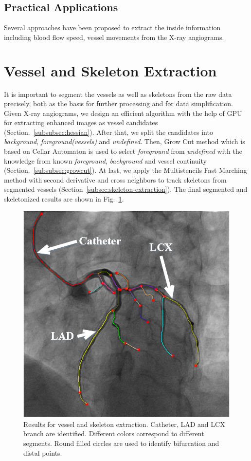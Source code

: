 \documentclass[journal]{IEEEtran}
\begin{document}
\subsection{Practical Applications}
Several approaches have been proposed to extract the inside information including blood flow speed, vessel movements from the X-ray angiograms.

\section{Vessel and Skeleton Extraction}
\label{sec:vessel-skeleton-extraction}
It is important to segment the vessels as well as skeletons from the raw data precisely, both as the basis for further processing and for data simplification. Given X-ray angiograms, we design an efficient algorithm with the help of GPU for extracting enhanced images as vessel candidates (Section.~\ref{subsubsec:hessian}). After that, we split the candidates into \textit{background}, \textit{foreground(vessels)} and \textit{undefined}. Then, Grow Cut method which is based on Cellar Automaton is used to select \textit{foreground} from \textit{undefined} with the knowledge from known \textit{foreground}, \textit{background} and vessel continuity (Section.~\ref{subsubsec:growcut}). At last, we apply the Multistencils Fast Marching method with second derivative and cross neighbors to track skeletons from segmented vessels (Section~\ref{subsec:skeleton-extraction}). The final segmented and skeletonized results are shown in Fig.~\ref{fig:step1_result}.

\begin{figure}[!t]
\centering
\includegraphics[width=1.0\linewidth]{./images/step1_result.png}
\caption{Results for vessel and skeleton extraction. Catheter, LAD and LCX branch are identified. Different colors correspond to different segments. Round filled circles are used to identify bifurcation and distal points.}
\label{fig:step1_result}
\end{figure}
\end{document}
